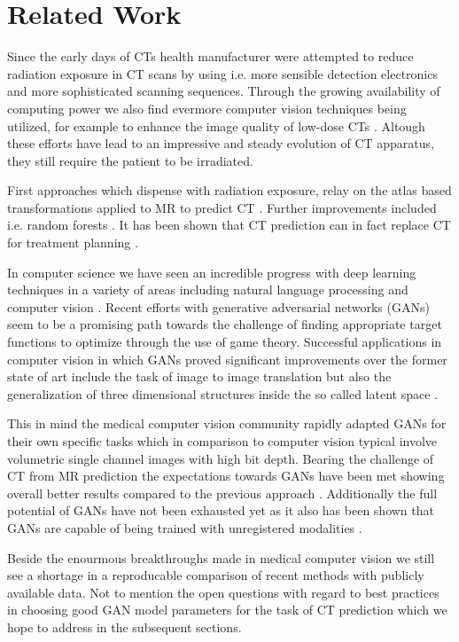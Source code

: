 \section{Related Work}

Since the early days of CTs health manufacturer were attempted to reduce
radiation exposure in CT scans by using i.e. more sensible detection
electronics and more sophisticated scanning sequences. Through the growing
availability of computing power we also find evermore computer vision
techniques being utilized, for example to enhance the image quality of
low-dose CTs \cite{Xu12}. Altough these efforts have lead to an
impressive and steady evolution of CT apparatus, they still require the
patient to be irradiated.

First approaches which dispense with radiation exposure, relay on the
atlas based transformations applied to MR to predict CT \cite{Hofmann08}.
Further improvements included i.e. random forests \cite{Andreasen13}.
It has been shown that CT prediction can in fact replace CT for treatment
planning \cite{Andreasen2017}.

In computer science we have seen an incredible progress with
deep learning techniques in a variety of areas including natural language
processing and computer vision \cite{LeCun15}. Recent efforts with generative
adversarial networks (GANs) \cite{Goodfellow14} seem to be a promising
path towards the challenge of finding appropriate target functions to optimize
through the use of game theory. Successful applications in computer vision
in which GANs proved significant improvements over the former state of art
include the task of image to image translation \cite{Isola16} but also the
generalization of three dimensional structures inside the so called latent
space \cite{ZXFT16}.

This in mind the medical computer vision community rapidly adapted
GANs for their own specific tasks which in comparison to computer
vision typical involve volumetric single channel images with high bit depth.
Bearing the challenge of CT from MR prediction the expectations towards GANs
have been met showing overall better results compared to the previous
approach \cite{Nie16}. Additionally the full potential of GANs have not
been exhausted yet as it also has been shown that GANs are capable of
being trained with unregistered modalities \cite{Wolterink17}.

Beside the enourmous breakthroughs made in medical computer vision we still
see a shortage in a reproducable comparison of recent methods with publicly
available data. Not to mention the open questions with regard to best
practices in choosing good GAN model parameters for the task of CT prediction
which we hope to address in the subsequent sections.

